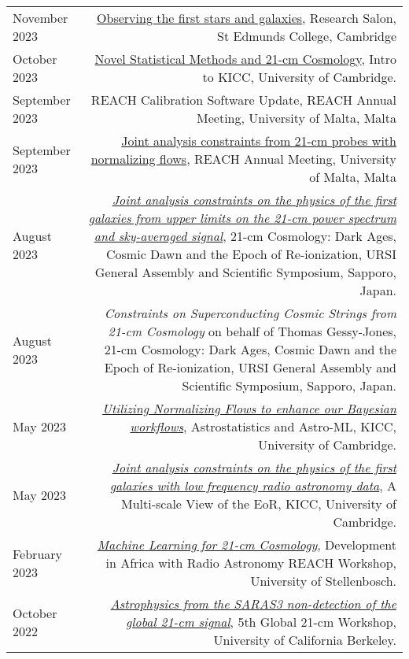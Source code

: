 \documentclass{article}
\begin{document}
\begin{tabular}{L!{\vrule}R}
    November 2023 & \href{https://github.com/htjb/Talks/raw/master/Talks/St_Edmunds_Research_Salon_Nov_2023/research_salon.pdf}{Observing the first stars and galaxies}, Research Salon, St Edmunds College, Cambridge \\
    October 2023 & \href{https://github.com/htjb/Talks/raw/master/Talks/KICC_Intro_23/kicc_intro_23.pdf}{Novel Statistical Methods and 21-cm Cosmology}, Intro to KICC, University of Cambridge. \\
    September 2023 & REACH Calibration Software Update, REACH Annual Meeting, University of Malta, Malta \\
    September 2023 & \href{https://github.com/htjb/Talks/tree/master/Talks/REACH_Malta/joint_analysis_margarine.pdf}{Joint analysis constraints from 21-cm probes with normalizing flows}, REACH Annual Meeting, University of Malta, Malta \\
    August 2023 & \href{https://github.com/htjb/Talks/raw/master/Talks/URSI_2023/joint_analysis_margarine.pdf}{\textit{Joint analysis constraints on the physics of the first galaxies from upper limits on the 21-cm power spectrum and sky-averaged signal}}, 21-cm Cosmology: Dark Ages, Cosmic Dawn and the Epoch of Re-ionization, URSI General Assembly and Scientific Symposium, Sapporo, Japan. \\
    August 2023 & \textit{Constraints on Superconducting Cosmic Strings from 21-cm Cosmology} on behalf of Thomas Gessy-Jones, 21-cm Cosmology: Dark Ages, Cosmic Dawn and the Epoch of Re-ionization, URSI General Assembly and Scientific Symposium, Sapporo, Japan. \\
    May 2023 & \href{https://github.com/htjb/Talks/blob/master/Talks/KICC_EoR/Bevins_KICC_EoR.pdf}{\textit{Utilizing Normalizing Flows to enhance our Bayesian workflows}}, Astrostatistics and Astro-ML, KICC, University of Cambridge. \\
    May 2023 & \href{https://github.com/htjb/Talks/blob/master/Talks/KICC_EoR/Bevins_KICC_EoR.pdf}{\textit{Joint analysis constraints on the physics of the first galaxies with low frequency radio astronomy data}}, A Multi-scale View of the EoR, KICC, University of Cambridge. \\
    February 2023 & \href{https://github.com/htjb/Talks/blob/master/Talks/DARA_REACH_Workshop/DARA_Workshop.pdf}{\textit{Machine Learning for 21-cm Cosmology}}, Development in Africa with Radio Astronomy REACH Workshop, University of Stellenbosch. \\
    October 2022 & \href{https://global21cmworkshop.org/2022-berkeley/}{\textit{Astrophysics from the SARAS3 non-detection of the global 21-cm signal}}, 5th Global 21-cm Workshop, University of California Berkeley. \\

\end{tabular}
\end{document}
